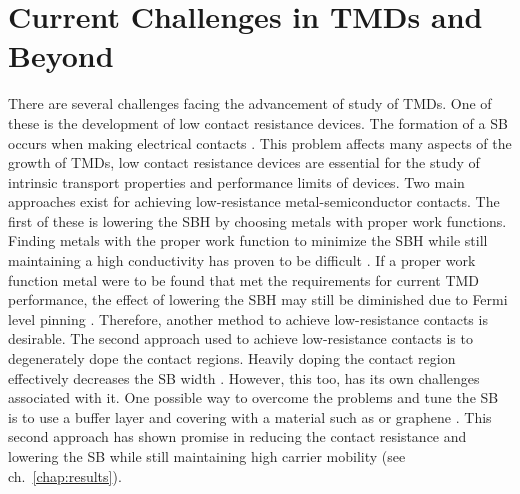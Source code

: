 \section{Current Challenges in \acp{TMD} and Beyond}\label{sec:tmds_and_beyond}
There are several challenges facing the advancement of study of \acp{TMD}. One of these is the development of low contact resistance devices. The formation of a \ac{SB} occurs when making electrical contacts \cite{Fang_NanoLett2012,Das_AppPhysLett2013}. This problem affects many aspects of the growth of \acp{TMD}, low contact resistance devices are essential for the study of intrinsic transport properties and performance limits of devices. Two main approaches exist for achieving low-resistance metal-semiconductor contacts. The first of these is lowering the \ac{SBH} by choosing metals with proper work functions. Finding metals with the proper work function to minimize the \acs{SBH} while still maintaining a high conductivity has proven to be difficult \cite{Liu_ACSnano2012,Das_NanoLett2012}. If a proper work function metal were to be found that met the requirements for current \acs{TMD} performance, the effect of lowering the \acs{SBH} may still be diminished due to Fermi level pinning \cite{Gong_NanoLett2014}. Therefore, another method to achieve low-resistance contacts is desirable. The second approach used to achieve low-resistance contacts is to degenerately dope the contact regions. Heavily doping the contact region effectively decreases the \acs{SB} width \cite{Suh_NanoLett2014}. However, this too, has its own challenges associated with it. One possible way to overcome the problems and tune the \acs{SB} is to use a buffer layer and covering with a material such as \hbn or graphene \cite{Geim_Nature2013,Farmanbar_PhysRevB2015,Kappera_NatureMat2014,Farmanbar_arxiv2016}. This second approach has shown promise in reducing the contact resistance and lowering the \acs{SB} while still maintaining high carrier mobility (see ch.~\ref{chap:results}).
